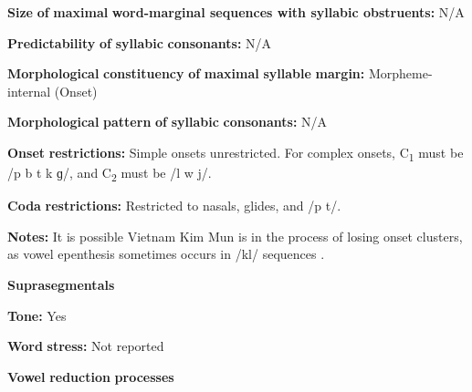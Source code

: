 \documentclass[output=paper]{langsci/langscibook}
\begin{document}
\begin{styleBody}
\textbf{Size} \textbf{of} \textbf{maximal} \textbf{word{}-marginal sequences with syllabic obstruents:} N/A
\end{styleBody}

\begin{styleBody}
\textbf{Predictability} \textbf{of} \textbf{syllabic} \textbf{consonants:} N/A
\end{styleBody}

\begin{styleBody}
\textbf{Morphological} \textbf{constituency} \textbf{of} \textbf{maximal} \textbf{syllable} \textbf{margin:} Morpheme-internal (Onset)
\end{styleBody}

\begin{styleBody}
\textbf{Morphological} \textbf{pattern} \textbf{of} \textbf{syllabic} \textbf{consonants:} N/A
\end{styleBody}

\begin{styleBody}
\textbf{Onset} \textbf{restrictions:} Simple onsets unrestricted. For complex onsets, C\textsubscript{1} must be /p b t k ɡ/, and C\textsubscript{2} must be /l w j/. 
\end{styleBody}

\begin{styleBody}
\textbf{Coda} \textbf{restrictions:} Restricted to nasals, glides, and /p t/.
\end{styleBody}

\begin{styleBody}
\textbf{Notes:} It is possible Vietnam Kim Mun is in the process of losing onset clusters, as vowel epenthesis sometimes occurs in /kl/ sequences \citep[127]{Clark2008}.
\end{styleBody}

\begin{styleBody}
\textbf{Suprasegmentals}
\end{styleBody}

\begin{styleBody}
\textbf{Tone:} Yes
\end{styleBody}

\begin{styleBody}
\textbf{Word} \textbf{stress:} Not reported
\end{styleBody}

\begin{styleBody}
\textbf{Vowel} \textbf{reduction} \textbf{processes}
\end{styleBody}
\end{document}
